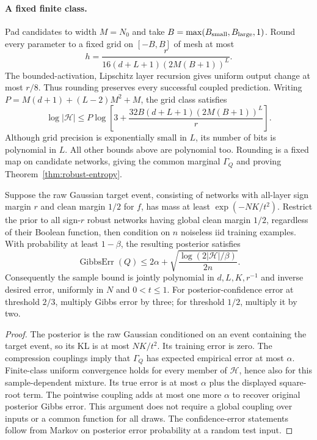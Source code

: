 \paragraph{A fixed finite class.}
Pad candidates to width $M=N_0$ and take
$B=\max(B_{\rm small},B_{\rm large},1)$. Round every parameter to a fixed
grid on $[-B,B]$ of mesh at most
\[
 h=\frac{r}{16(d+L+1)(2M(B+1))^L}.
\]
The bounded-activation, Lipschitz layer recursion gives uniform output change
at most $r/8$. Thus rounding preserves every successful coupled prediction.
Writing $P=M(d+1)+(L-2)M^2+M$, the grid class satisfies
\[
 \log|\mathcal H|\le
 P\log\left[3+\frac{32B(d+L+1)(2M(B+1))^L}{r}\right].
\]
Although grid precision is exponentially small in $L$, its number of bits is
polynomial in $L$. All other bounds above are polynomial too. Rounding is a
fixed map on candidate networks, giving the common marginal $\Gamma_Q$ and
proving Theorem~\ref{thm:robust-entropy}.

\begin{corollary}
\label{cor:robust-entropy-pac}
Suppose the raw Gaussian target event, consisting of networks with all-layer
sign margin $r$ and clean margin $1/2$ for $f$, has mass at least
$\exp(-NK/t^2)$. Restrict the prior to all sign-$r$ robust networks having
global clean margin $1/2$, regardless of their Boolean function, then condition
on $n$ noiseless iid training examples. With probability at least $1-\beta$,
the resulting posterior satisfies
\[
 \operatorname{GibbsErr}(Q)
 \le2\alpha+\sqrt{\frac{\log(2|\mathcal H|/\beta)}{2n}}.
\]
Consequently the sample bound is jointly polynomial in
$d,L,K,r^{-1}$ and inverse desired error, uniformly in $N$ and $0<t\le1$.
For posterior-confidence error at threshold $2/3$, multiply Gibbs error by
three; for threshold $1/2$, multiply it by two.
\end{corollary}
\begin{proof}
The posterior is the raw Gaussian conditioned on an event containing the target
event, so its KL is at most $NK/t^2$. Its training error is zero. The compression
couplings imply that $\Gamma_Q$ has expected empirical error at most $\alpha$.
Finite-class uniform convergence holds for every member of $\mathcal H$, hence
also for this sample-dependent mixture. Its true error is at most $\alpha$
plus the displayed square-root term. The pointwise coupling adds at most one
more $\alpha$ to recover original posterior Gibbs error. This argument does
not require a global coupling over inputs or a common function for all draws.
The confidence-error statements follow from Markov on posterior error
probability at a random test input.
\end{proof}
